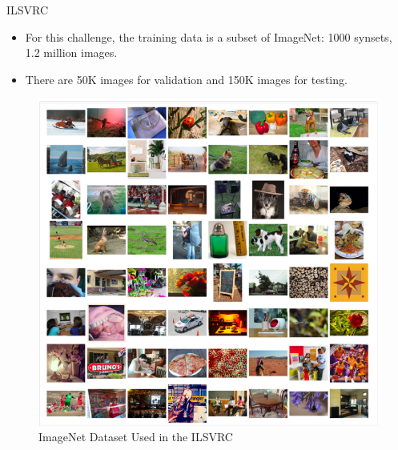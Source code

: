 \documentclass{beamer}
\begin{document}
\begin{frame}{ILSVRC}
	\begin{itemize}
		\item For this challenge, the training data is a subset of ImageNet: 1000 synsets, 1.2 million images.
		\item There are 50K images for validation and 150K images for testing.
	\end{itemize}
	\vspace{10pt}
	\begin{figure}[h]		
		\centering
		\includegraphics[scale=0.35]{./ilsvrc/ilsvrc_2.PNG}
		\caption{ImageNet Dataset Used in the ILSVRC}
		\label{ilsvrc:images}
	\end{figure}
\end{frame}
\end{document}
